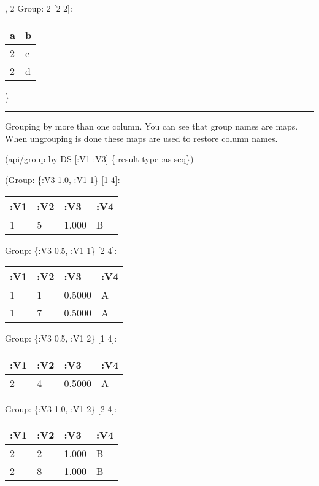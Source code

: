 \documentclass[]{article}
\newenvironment{Shaded}{\begin{snugshade}}{\end{snugshade}}
\newcommand{\AttributeTok}[1]{\textcolor[rgb]{0.77,0.63,0.00}{#1}}
\newcommand{\NormalTok}[1]{#1}
\begin{document}
, 2 Group: 2 {[}2 2{]}:

\begin{longtable}[]{@{}ll@{}}
\toprule
a & b\tabularnewline
\midrule
\endhead
2 & c\tabularnewline
2 & d\tabularnewline
\bottomrule
\end{longtable}

\}

\begin{center}\rule{0.5\linewidth}{0.5pt}\end{center}

Grouping by more than one column. You can see that group names are maps.
When ungrouping is done these maps are used to restore column names.

\begin{Shaded}
\begin{Highlighting}[]
\NormalTok{(api/group-by DS [}\AttributeTok{:V1} \AttributeTok{:V3}\NormalTok{] \{}\AttributeTok{:result-type} \AttributeTok{:as-seq}\NormalTok{\})}
\end{Highlighting}
\end{Shaded}

(Group: \{:V3 1.0, :V1 1\} {[}1 4{]}:

\begin{longtable}[]{@{}llll@{}}
\toprule
:V1 & :V2 & :V3 & :V4\tabularnewline
\midrule
\endhead
1 & 5 & 1.000 & B\tabularnewline
\bottomrule
\end{longtable}

Group: \{:V3 0.5, :V1 1\} {[}2 4{]}:

\begin{longtable}[]{@{}llll@{}}
\toprule
:V1 & :V2 & :V3 & :V4\tabularnewline
\midrule
\endhead
1 & 1 & 0.5000 & A\tabularnewline
1 & 7 & 0.5000 & A\tabularnewline
\bottomrule
\end{longtable}

Group: \{:V3 0.5, :V1 2\} {[}1 4{]}:

\begin{longtable}[]{@{}llll@{}}
\toprule
:V1 & :V2 & :V3 & :V4\tabularnewline
\midrule
\endhead
2 & 4 & 0.5000 & A\tabularnewline
\bottomrule
\end{longtable}

Group: \{:V3 1.0, :V1 2\} {[}2 4{]}:

\begin{longtable}[]{@{}llll@{}}
\toprule
:V1 & :V2 & :V3 & :V4\tabularnewline
\midrule
\endhead
2 & 2 & 1.000 & B\tabularnewline
2 & 8 & 1.000 & B\tabularnewline
\bottomrule
\end{longtable}
\end{document}

